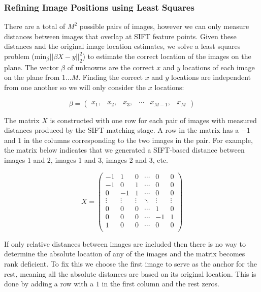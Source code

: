 \documentclass[10pt,twocolumn,letterpaper]{article}
\begin{document}
\subsubsection{Refining Image Positions using Least Squares}

There are a total of $M^{2}$ possible pairs of images, however we can only measure distances between images that overlap at SIFT feature points. Given these distances and the original image location estimates, we solve a least squares problem ($\textrm{min}_{\beta} ||\beta X - y||_2^2 $) to estimate the correct location of the images on the plane. The vector $\beta$ of unknowns are the correct $x$ and $y$ locations of each image on the plane from $1 \dots M$. Finding the correct $x$ and $y$ locations are independent from one another so we will only consider the $x$ locations:


\[\beta =
 \begin{pmatrix}
  x_1, & x_2, & x_3, & \cdots & x_{M-1}, & x_M
 \end{pmatrix}
\]

The matrix $X$ is constructed with one row for each pair of images with measured distances produced by the SIFT matching stage. A row in the matrix has a $-1$ and $1$ in the columns corresponding to the two images in the pair. For example, the matrix below indicates that we generated a SIFT-based distance between images 1 and 2, images 1 and 3, images 2 and 3, etc. 

\[
 X =
 \begin{pmatrix}
  -1 & 1 & 0 & \cdots & 0 & 0\\
  -1 & 0 & 1 & \cdots & 0 & 0\\
   0 & -1 & 1 & \cdots & 0 & 0\\
  \vdots  & \vdots & \vdots & \ddots & \vdots  & \vdots\\
  0 & 0 & 0 & \cdots & 1 & 0 \\ 
  0 & 0 & 0 & \cdots & -1 & 1 \\ 
  1 & 0 & 0 & \cdots & 0 & 0 \\ 
 \end{pmatrix}
\]

If only relative distances between images are included then there is no way to determine the absolute location of any of the images and the matrix becomes rank deficient. To fix this we choose the first image to serve as the anchor for the rest, meaning all the absolute distances are based on its original location. This is done by adding a row with a $1$ in the first column and the rest zeros. 
\end{document}
